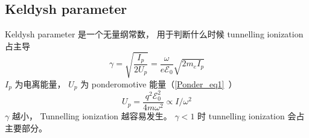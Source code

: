 
\begin{issues}
\issueDraft
\end{issues}


\subsection{Keldysh parameter}
Keldysh parameter 是一个无量纲常数， 用于判断什么时候 tunnelling ionization 占主导
\begin{equation}
\gamma = \sqrt{\frac{I_p}{2U_p}} = \frac{\omega}{e\mathcal E_0} \sqrt{2m_e I_p}
\end{equation}
$I_p$ 为电离能量， $U_p$ 为 ponderomotive 能量（\autoref{Ponder_eq1}~）
\begin{equation}
U_p = \frac{q^2 \mathcal E_0^2}{4m\omega^2} \propto I/\omega^2
\end{equation}
$\gamma$ 越小， Tunnelling ionization 越容易发生。 $\gamma < 1$ 时 tunnelling ionization 会占主要部分。
